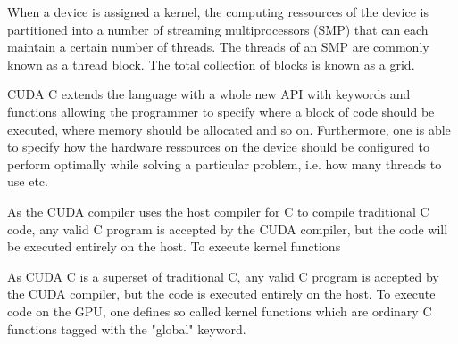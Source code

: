 When a device is assigned a kernel, the computing ressources of the device is partitioned into a number of streaming multiprocessors (SMP) that can each maintain a certain number of threads. The threads of an SMP are  commonly known as a thread block. The total collection of blocks is known as a grid. 

CUDA C extends the language with a whole new API with keywords and functions allowing the programmer to specify where a block of code should be executed, where memory should be allocated and so on. Furthermore, one is able to specify how the hardware ressources on the device should be configured to perform optimally while solving a particular problem, i.e. how many threads to use etc.



As the CUDA compiler uses the host compiler for C to compile traditional C code, any valid C program is accepted by the CUDA compiler, but the code will be executed entirely on the host. To execute kernel functions 


As CUDA C is a superset of traditional C, any valid C program is accepted by the CUDA compiler, but the code is executed entirely on the host. To execute code on the GPU, one defines so called kernel functions which are ordinary C functions tagged with the "global" keyword.